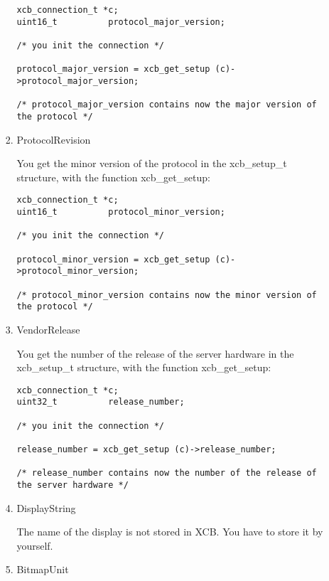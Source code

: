 \documentclass[12pt,oneside,titlepage]{book}
\begin{document}
\begin{enumerate}
\begin{enumerate}
\begin{enumerate}
\begin{verbatim}
xcb_connection_t *c;
uint16_t          protocol_major_version;

/* you init the connection */

protocol_major_version = xcb_get_setup (c)->protocol_major_version;

/* protocol_major_version contains now the major version of the protocol */
\end{verbatim}
    \item
      \protect\hypertarget{ProtocolRevision}{}{}ProtocolRevision

      You get the minor version of the protocol in the {xcb\_setup\_t}
      structure, with the function {xcb\_get\_setup}:

\begin{verbatim}
xcb_connection_t *c;
uint16_t          protocol_minor_version;

/* you init the connection */

protocol_minor_version = xcb_get_setup (c)->protocol_minor_version;

/* protocol_minor_version contains now the minor version of the protocol */
\end{verbatim}
    \item
      \protect\hypertarget{VendorRelease}{}{}VendorRelease

      You get the number of the release of the server hardware in the
      {xcb\_setup\_t} structure, with the function {xcb\_get\_setup}:

\begin{verbatim}
xcb_connection_t *c;
uint32_t          release_number;

/* you init the connection */

release_number = xcb_get_setup (c)->release_number;

/* release_number contains now the number of the release of the server hardware */
\end{verbatim}
    \item
      \protect\hypertarget{DisplayString}{}{}DisplayString

      The name of the display is not stored in XCB. You have to store it
      by yourself.
    \item
      \protect\hypertarget{BitmapUnit}{}{}BitmapUnit


\end{enumerate}
\end{enumerate}
\end{enumerate}
\end{document}
